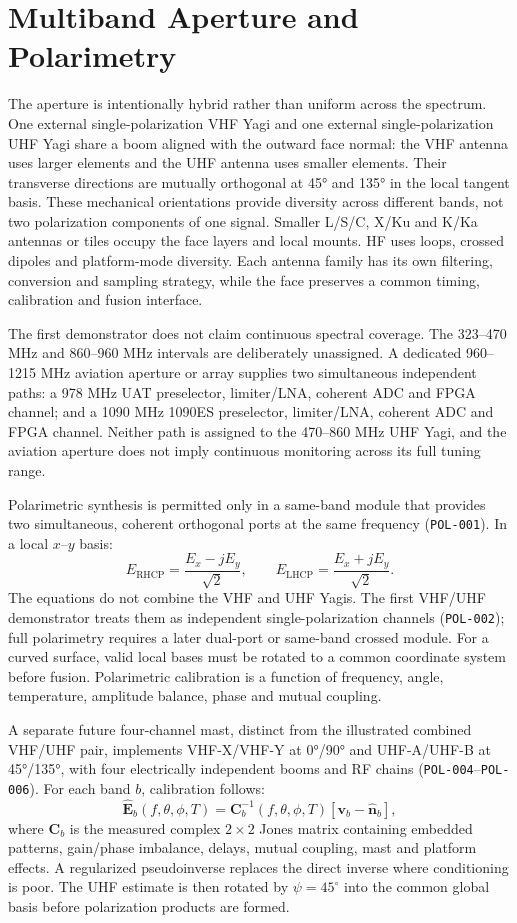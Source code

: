 \chapter{Multiband Aperture and Polarimetry}

The aperture is intentionally hybrid rather than uniform across the spectrum. One external single-polarization VHF Yagi and one external single-polarization UHF Yagi share a boom aligned with the outward face normal: the VHF antenna uses larger elements and the UHF antenna uses smaller elements. Their transverse directions are mutually orthogonal at 45° and 135° in the local tangent basis. These mechanical orientations provide diversity across different bands, not two polarization components of one signal. Smaller L/S/C, X/Ku and K/Ka antennas or tiles occupy the face layers and local mounts. HF uses loops, crossed dipoles and platform-mode diversity. Each antenna family has its own filtering, conversion and sampling strategy, while the face preserves a common timing, calibration and fusion interface.

The first demonstrator does not claim continuous spectral coverage. The 323--470 MHz and 860--960 MHz intervals are deliberately unassigned. A dedicated 960--1215 MHz aviation aperture or array supplies two simultaneous independent paths: a 978 MHz UAT preselector, limiter/LNA, coherent ADC and FPGA channel; and a 1090 MHz 1090ES preselector, limiter/LNA, coherent ADC and FPGA channel. Neither path is assigned to the 470--860 MHz UHF Yagi, and the aviation aperture does not imply continuous monitoring across its full tuning range.

Polarimetric synthesis is permitted only in a same-band module that provides two simultaneous, coherent orthogonal ports at the same frequency (\texttt{POL-001}). In a local $x$--$y$ basis:
\[
E_{\mathrm{RHCP}}=\frac{E_x-jE_y}{\sqrt{2}},\qquad E_{\mathrm{LHCP}}=\frac{E_x+jE_y}{\sqrt{2}}.
\]
The equations do not combine the VHF and UHF Yagis. The first VHF/UHF demonstrator treats them as independent single-polarization channels (\texttt{POL-002}); full polarimetry requires a later dual-port or same-band crossed module. For a curved surface, valid local bases must be rotated to a common coordinate system before fusion. Polarimetric calibration is a function of frequency, angle, temperature, amplitude balance, phase and mutual coupling.

A separate future four-channel mast, distinct from the illustrated combined VHF/UHF pair, implements VHF-X/VHF-Y at 0°/90° and UHF-A/UHF-B at 45°/135°, with four electrically independent booms and RF chains (\texttt{POL-004}--\texttt{POL-006}). For each band $b$, calibration follows:
\[
\widehat{\mathbf{E}}_b(f,\theta,\phi,T)=
\mathbf{C}_b^{-1}(f,\theta,\phi,T)
\left[\mathbf{v}_b-\widehat{\mathbf{n}}_b\right],
\]
where $\mathbf{C}_b$ is the measured complex $2\times2$ Jones matrix containing embedded patterns, gain/phase imbalance, delays, mutual coupling, mast and platform effects. A regularized pseudoinverse replaces the direct inverse where conditioning is poor. The UHF estimate is then rotated by $\psi=45^\circ$ into the common global basis before polarization products are formed.

